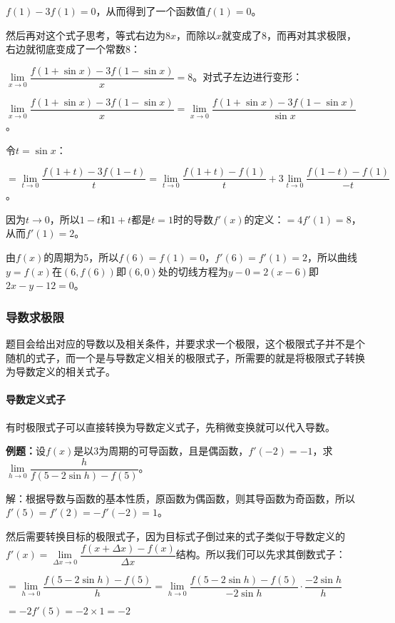 \documentclass[UTF8, 12pt]{ctexart}
\begin{document}
$f(1)-3f(1)=0$，从而得到了一个函数值$f(1)=0$。

然后再对这个式子思考，等式右边为$8x$，而除以$x$就变成了8，而再对其求极限，右边就彻底变成了一个常数8：

$\lim\limits_{x\to 0}\dfrac{f(1+\sin x)-3f(1-\sin x)}{x}=8$。对式子左边进行变形：

$\lim\limits_{x\to 0}\dfrac{f(1+\sin x)-3f(1-\sin x)}{x}=\lim\limits_{x\to 0}\dfrac{f(1+\sin x)-3f(1-\sin x)}{\sin x}$。

令$t=\sin x$：

$=\lim\limits_{t\to 0}\dfrac{f(1+t)-3f(1-t)}{t}=\lim\limits_{t\to 0}\dfrac{f(1+t)-f(1)}{t}+3\lim\limits_{t\to 0}\dfrac{f(1-t)-f(1)}{-t}$。

因为$t\to 0$，所以$1-t$和$1+t$都是$t=1$时的导数$f'(x)$的定义：$=4f'(1)=8$，从而$f'(1)=2$。

由$f(x)$的周期为5，所以$f(6)=f(1)=0$，$f'(6)=f'(1)=2$，所以曲线$y=f(x)$在$(6,f(6))$即$(6,0)$处的切线方程为$y-0=2(x-6)$即$2x-y-12=0$。

\subsubsection{导数求极限}

题目会给出对应的导数以及相关条件，并要求求一个极限，这个极限式子并不是个随机的式子，而一个是与导数定义相关的极限式子，所需要的就是将极限式子转换为导数定义的相关式子。

\paragraph{导数定义式子} \leavevmode \medskip

有时极限式子可以直接转换为导数定义式子，先稍微变换就可以代入导数。

\textbf{例题：}设$f(x)$是以3为周期的可导函数，且是偶函数，$f'(-2)=-1$，求$\lim\limits_{h\to 0}\dfrac{h}{f(5-2\sin h)-f(5)}$。\medskip

解：根据导数与函数的基本性质，原函数为偶函数，则其导函数为奇函数，所以$f'(5)=f'(2)=-f'(-2)=1$。

然后需要转换目标的极限式子，因为目标式子倒过来的式子类似于导数定义的$f'(x)=\lim\limits_{\Delta x\to 0}\dfrac{f(x+\Delta x)-f(x)}{\Delta x}$结构。所以我们可以先求其倒数式子：\medskip

$=\lim\limits_{h\to 0}\dfrac{f(5-2\sin h)-f(5)}{h}=\lim\limits_{h\to 0}\dfrac{f(5-2\sin h)-f(5)}{-2\sin h}\cdot\dfrac{-2\sin h}{h}$

$=-2f'(5)=-2\times 1=-2$
\end{document}
